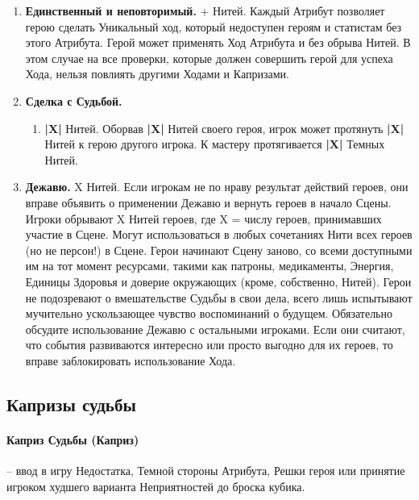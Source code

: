 \begin{enumerate}
    \item \textbf{Единственный и неповторимый.}
    + Нитей. Каждый Атрибут позволяет герою сделать Уникальный ход, который недоступен героям и статистам без этого Атрибута.  
	Герой может применять Ход Атрибута и без обрыва Нитей. В этом случае на все проверки, которые должен совершить герой для успеха Хода, нельзя повлиять другими Ходами и Капризами.

	\item \textbf{Сделка с Судьбой.}
	\begin{enumerate}
        \item \textbf{|X|} Нитей. Оборвав \textbf{|X|} Нитей своего героя, игрок может протянуть \textbf{|X|} Нитей к герою другого игрока. К мастеру протягивается \textbf{|X|} Темных Нитей.
    \end{enumerate}

	\item \textbf{Дежавю.}
	\newline X Нитей. Если игрокам не по нраву результат действий героев, они вправе объявить о применении Дежавю и вернуть героев в начало Сцены. 
    \newline Игроки обрывают X Нитей героев, где X = числу героев, принимавших участие в Сцене. Могут использоваться в любых сочетаниях Нити всех героев (но не персон!) в Сцене.
    \newline Герои начинают Сцену заново, со всеми доступными им на тот момент ресурсами, такими как патроны, медикаменты, Энергия, Единицы Здоровья и доверие окружающих (кроме, собственно, Нитей). Герои не подозревают о вмешательстве Судьбы в свои дела, всего лишь испытывают мучительно ускользающее чувство воспоминаний о будущем.
    \newline Обязательно обсудите использование Дежавю с остальными игроками. Если они считают, что события развиваются интересно или просто выгодно для их героев, то вправе заблокировать использование Хода. 
\end{enumerate}

\subsection{Капризы судьбы}
\paragraph{Каприз Судьбы (Каприз)} – ввод в игру Недостатка, Темной стороны Атрибута, Решки героя или принятие игроком худшего варианта Неприятностей до броска кубика. 
